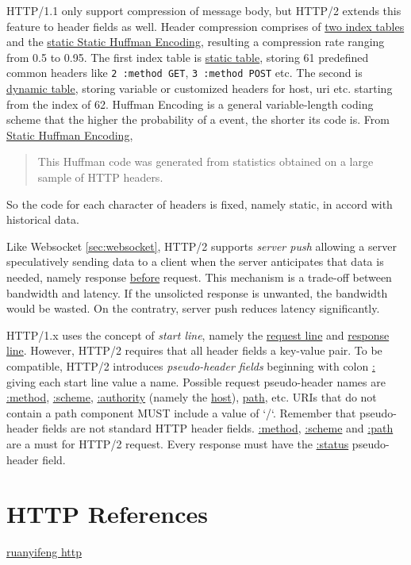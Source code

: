 HTTP/1.1 only support compression of message body, but HTTP/2
extends this feature to header fields as well. Header compression
comprises of \uline{two index tables} and the \uline{static Static
  Huffman Encoding}, resulting a compression rate ranging from 0.5
to 0.95. The first index table is \uline{static table}, storing 61
predefined common headers like \verb|2 :method GET|,
\verb|3 :method POST| etc. The second is \uline{dynamic table},
storing variable or customized headers for host, uri etc. starting
from the index of 62. Huffman Encoding is a general
variable-length coding scheme that the higher the probability of a
event, the shorter its code is. From
\href{https://tools.ietf.org/html/rfc7541#appendix-B}{Static
  Huffman Encoding},
\begin{quotation}
  This Huffman code was generated from statistics obtained on a
  large sample of HTTP headers.
\end{quotation}

So the code for each character of headers is fixed, namely static,
in accord with historical data.

Like Websocket \ref{sec:websocket}, HTTP/2 supports \textit{server
  push} allowing a server speculatively sending data to a client
when the server anticipates that data is needed, namely response
\uline{before} request. This mechanism is a trade-off between
bandwidth and latency. If the unsolicted response is unwanted, the
bandwidth would be wasted. On the contratry, server push reduces
latency significantly.

HTTP/1.x uses the concept of \textit{start line}, namely the
\uline{request line} and \uline{response line}. However, HTTP/2
requires that all header fields a key-value pair. To be
compatible, HTTP/2 introduces \textit{pseudo-header fields}
beginning with colon \uline{:} giving each start line value a
name. Possible request pseudo-header names are \uline{:method},
\uline{:scheme}, \uline{:authority} (namely the \uline{host}),
\uline{path}, etc. URIs that do not contain a path component MUST
include a value of `/`. Remember that pseudo-header fields are not
standard HTTP header fields. \uline{:method}, \uline{:scheme} and
\uline{:path} are a must for HTTP/2 request. Every response must
have the \uline{:status} pseudo-header field.

\section{HTTP References}
\label{sec:http-references}

\href{http://www.ruanyifeng.com/blog/2016/08/http.html}{ruanyifeng http}

